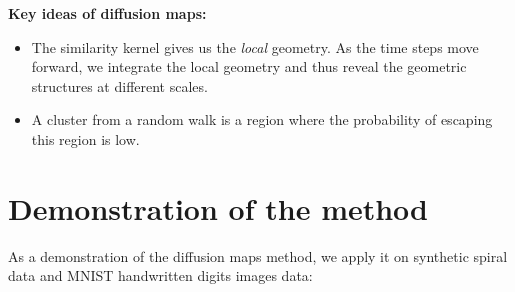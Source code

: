 \par \textbf{Key ideas of diffusion maps: }
\begin{itemize}
    \item The similarity kernel gives us the \textit{local} geometry. As the time steps move forward, we integrate the local geometry and thus reveal the geometric structures at different scales. 
    \item A cluster from a random walk is a region where the probability of escaping this region is low.
\end{itemize}

\section{Demonstration of the method}
As a demonstration of the diffusion maps method, we apply it on synthetic spiral data and MNIST handwritten digits images data:

